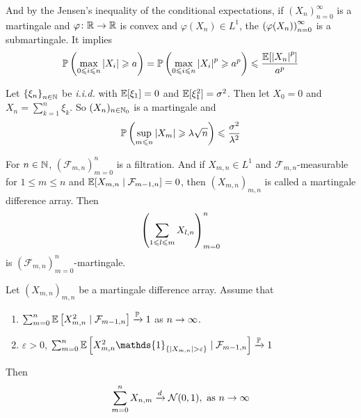 \documentclass[a4paper,12pt]{article}
\begin{document}
\begin{itemize}
  And by the Jensen's inequality of the conditional expectations, if $(X_n)_{n=0}^{\infty}$ is a martingale and $\varphi \colon \mathbb{R} \rightarrow \mathbb{R}$ is convex and $\varphi(X_n) \in L^1$, the $\left(\varphi(X_n)\right)_{n=0}^{\infty}$ is a submartingale. It implies
  \begin{equation*}
    \mathbb{P}\left(\max_{0\leqslant i \leqslant n}\left\lvert X_i\right\lvert \geqslant a\right) = \mathbb{P}\left(\max_{0\leqslant i \leqslant n}\left\lvert X_i\right\lvert^p \geqslant a^p\right) \leqslant \frac{\mathbb{E}[\left\lvert X_n\right\lvert^p]}{a^p}
  \end{equation*}

  \begin{exam}
    Let $\left\{\xi_n\right\}_{n\in \mathbb{N}}$ be \emph{i.i.d.} with $\mathbb{E}[\xi_1] = 0$ and $\mathbb{E}[\xi_1^2] = \sigma^2$. Then let $X_0= 0$ and $X_n =\sum_{k=1}^n\xi_k$. So $(X_n)_{n \in \mathbb{N}_0}$ is a martingale and
    \begin{equation*}
      \mathbb{P}\left(\sup_{m \leqslant n}\left\lvert X_m\right\lvert \geqslant \lambda\sqrt{n}\right) \leqslant \frac{\sigma^2}{\lambda^2}
    \end{equation*}
  \end{exam}

  \noindent For $n \in \mathbb{N}$, $(\mathcal{F}_{m,n})_{m=0}^{n}$ is a filtration. And if $X_{m,n} \in L^1$ and $\mathcal{F}_{m,n}$-measurable for $1 \leqslant m \leqslant n$ and $\mathbb{E}[X_{m,n} \mid \mathcal{F}_{m-1, n}] = 0$, then $(X_{m,n})_{m,n}$ is called a martingale difference array. Then
  \begin{equation*}
    \left(\sum_{1\leqslant l \leqslant m}X_{l,n}\right)_{m=0}^n
  \end{equation*}
  is $(\mathcal{F}_{m,n})_{m=0}^n$-martingale.
  \begin{thm}
    Let $(X_{m,n})_{m,n}$ be a martingale difference array. Assume that
    \begin{enumerate}[label=(\arabic*)]
      \item $\sum_{m=0}^n \mathbb{E}\left[X_{m,n}^2 \mid \mathcal{F}_{m-1,n}\right] \xrightarrow{\mathbb{P}} 1$ as $n\rightarrow \infty$.
      \item $\varepsilon > 0$, $\sum_{m=0}^n \E\bj{X_{m,n}^2\mathds{1}_{\bb{\abs{X_{m,n}} > \varepsilon}} \mid \mathcal{F}_{m-1,n}} \xrightarrow{\Pb} 1$
    \end{enumerate}
    Then
    \begin{equation*}
      \sum_{m=0}^nX_{n,m} \xrightarrow{d} \mathcal{N}(0,1),~\text{as } n\rightarrow \infty
    \end{equation*}
  \end{thm}


\end{itemize}
\end{document}
